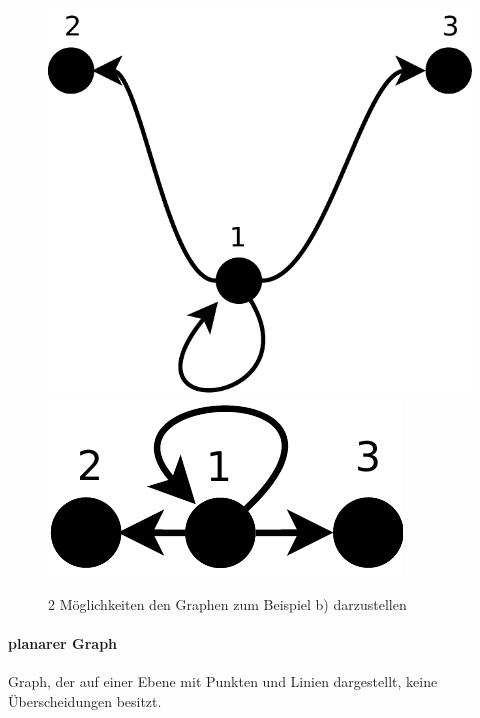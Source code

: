 \begin{figure}
\centering
 \includegraphics[scale=0.4]{./bilder/multigraph_bsp_b1.pdf}
 \includegraphics[scale=0.4]{./bilder/multigraph_bsp_b2.pdf}
 \caption{2 Möglichkeiten den Graphen zum Beispiel b) darzustellen}
\end{figure}

\paragraph{planarer Graph} Graph, der auf einer Ebene mit Punkten und
Linien dargestellt, keine Überscheidungen besitzt.

